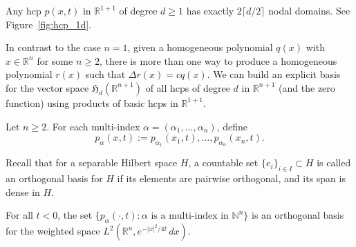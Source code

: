 \documentclass[AHL,Unicode,longabstracts,published]{cedram}
\newcommand{\N}{\mathbb{N}}
\newcommand{\R}{\mathbb{R}}
\newcommand{\HCP}[1]{\mathfrak{H}_{#1}}
\newcommand{\R}{\mathbb{R}}
\begin{document}
\begin{coro}\label{cor:dim_1}
Any hcp $p(x,t)$ in $\R^{1+1}$ of degree $d\geq 1$ has exactly $2\lceil d/2\rceil$ nodal domains. See Figure~\ref{fig:hcp_1d}.
\end{coro}

In contrast to the case $n=1$, given a homogeneous polynomial $q(x)$ with $x\in\R^n$ for some $n\geq 2$, there is more than one way to produce a homogeneous polynomial $r(x)$ such that $\Delta r(x) = cq(x)$. We can build an explicit basis for the vector space $\HCP{d}(\R^{n+1})$ of all hcps of degree $d$ in $\R^{n+1}$ (and the zero function) using products of basic hcps in $\R^{1+1}$.

\begin{defi}
Let $n\geq 2$. For each multi-index $\alpha=(\alpha_1,\dots,\alpha_n)$, define
\begin{equation}
p_\alpha(x,t):=p_{\alpha_1}(x_1,t),\dots, p_{\alpha_n}(x_n,t). \label{eqn:p_alpha}
\end{equation}
\end{defi}

{Recall that for a separable Hilbert space $H$, a countable set $\{e_i\}_{i \in I} \subset H$ is called an orthogonal basis for $H$ if its elements are pairwise orthogonal, and its span is dense in $H$.}

\begin{lemm}\label{cor:orth}
For all $t<0$, the set $\{p_\alpha(\cdot,t):\alpha\text{ is a multi-index in }\N^n\}$ is an orthogonal basis for the weighted space $L^2(\R^n,e^{-|x|^2/4t}\,dx)$.
\end{lemm}
\end{document}
